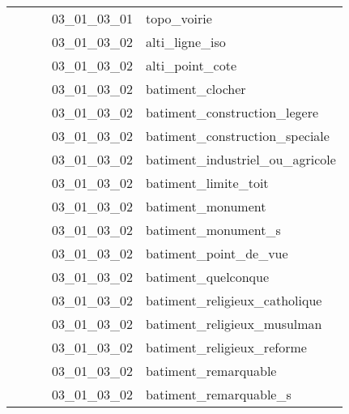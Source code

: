 \documentclass[12pt,titlepage]{book}
\begin{document}
\begin{supertabular}{|p{7.5cm}|p{7.5cm}|p{7.5cm}|c|p{10cm}|}
                   &                    &                    & 03\_01\_03\_01 & topo\_voirie\\
                   &                    &                    & 03\_01\_03\_02 & alti\_ligne\_iso\\
                   &                    &                    & 03\_01\_03\_02 & alti\_point\_cote\\
                   &                    &                    & 03\_01\_03\_02 & batiment\_clocher\\
                   &                    &                    & 03\_01\_03\_02 & batiment\_construction\_legere\\
                   &                    &                    & 03\_01\_03\_02 & batiment\_construction\_speciale\\
                   &                    &                    & 03\_01\_03\_02 & batiment\_industriel\_ou\_agricole\\
                   &                    &                    & 03\_01\_03\_02 & batiment\_limite\_toit\\
                   &                    &                    & 03\_01\_03\_02 & batiment\_monument\\
                   &                    &                    & 03\_01\_03\_02 & batiment\_monument\_s\\
                   &                    &                    & 03\_01\_03\_02 & batiment\_point\_de\_vue\\
                   &                    &                    & 03\_01\_03\_02 & batiment\_quelconque\\
                   &                    &                    & 03\_01\_03\_02 & batiment\_religieux\_catholique\\
                   &                    &                    & 03\_01\_03\_02 & batiment\_religieux\_musulman\\
                   &                    &                    & 03\_01\_03\_02 & batiment\_religieux\_reforme\\
                   &                    &                    & 03\_01\_03\_02 & batiment\_remarquable\\
                   &                    &                    & 03\_01\_03\_02 & batiment\_remarquable\_s\\

\end{supertabular}
\end{document}
